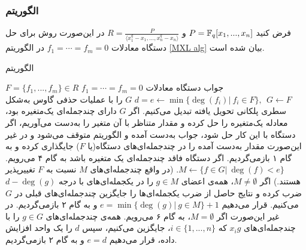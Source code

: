 \subsubsection*{الگوریتم 
	}
فرض کنید 
$P = \mathbb{F}_{q}[x_{1},...,x_{n}]$
و
$R = \frac{P}{\langle x_{1}^{q} - x_{1},...,x_{n}^{q} - x_{n}\rangle}$
در این‌صورت روش 
برای حل دستگاه معادلات 
$f_{1} = \cdots = f_{m} = 0$
در الگوریتم 
\ref{MXL alg}
بیان شده است. 
\renewcommand{\algorithmicrequire}{\textbf{ورودی}}
\renewcommand{\algorithmicensure}{\textbf{خروجی}}
\begin{algorithm}
\caption{الگوریتم 
		}
\label{MXL alg}	
	\begin{algorithmic}[1]				
		\REQUIRE $F = \{f_{1},...,f_{m}\}\in R$		
		\ENSURE جواب دستگاه معادلات 
		$f_{1} = \cdots = f_{m} = 0$ 
		\STATE $d = e \gets \min\{\deg(f_{i})| \ f_{i}\in F\}, \ \ G\gets F$
		\STATE $G$
		را با عملیات حذفی گاوس به‌‌شکل سطری پلکانی تحویل یافته تبدیل می‌کنیم.
		\STATE اگر 
		$G$
		دارای چندجمله‌ای یک‌متغیره بود، معادله یک‌متغیره را حل کرده و مقدار متناظر با آن متغیر را به‌دست می‌آوریم، اگر دستگاه با این کار حل شود، جواب به‌دست  آمده و الگوریتم متوقف می‌شود و در غیر این‌صورت مقدار به‌دست  آمده را در چندجمله‌ای‌های دستگاه(یا $F$)
		 جایگذاری کرده و به گام ۱ بازمی‌گردیم. اگر دستگاه فاقد چندجمله‌ای یک متغیره باشد به گام ۴ می‌رویم. 
		\STATE $M\gets \{f\in G| \ \deg(f) < e \}$.
		 {\footnotesize (در واقع چندجمله‌ای‌های 
		 $M$
		 نسبت به 
		 $F$
		 تغییرپذیر هستند.)}
		 \STATE اگر 
		 $M\neq \emptyset$،
		  همه‌ی اعضای 
		 $g\in M$
		 را در یکجمله‌ای‌های با درجه‌ 
		 $d - \deg(g)$
		 ضرب کرده و نتایج حاصل از ضرب یکجمله‌ای‌ها  را جایگزین چندجمله‌ای‌های قبلی در 
		 $G$
		 می‌کنیم. قرار می‌دهیم 
		 {\small $e = \min\{\deg(g)| \ g\in M\} + 1$}
		 و به گام ۲ بازمی‌گردیم. در غیر این‌صورت اگر 
		 $M = \emptyset$، 
		 به گام ۶ می‌رویم. 
		 \STATE همه‌ی چندجمله‌ای‌های 
		 $g\in G$
		 را با چندجمله‌ای‌های 
		 $x_{i}g$
		 که 
		 $i\in \{1,...,n\}$، 
		  جایگزین می‌کنیم، سپس 
		 $d$
		 را یک واحد افزایش داده، قرار می‌دهیم 
		 $e = d$
		 و به‌ گام ۲ بازمی‌گردیم. 
		
	\end{algorithmic}
\end{algorithm}

